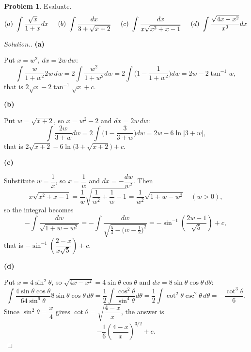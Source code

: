 \documentclass[11pt,a4paper]{article}
\theoremstyle{definition}
\newtheorem{problemx}{Problem}[subsection]
\newenvironment{problem}{\begin{problemx}}{\end{problemx}}
\newenvironment{solution}
  {\renewcommand{\qedsymbol}{}\begin{proof}[\textit{Solution}.]}
  {\end{proof}}
\newcommand{\subhead}[1]{%
  \par\medskip\noindent\textbf{#1}\par\nobreak\smallskip}
\begin{document}
\begin{problem}
Evaluate.
$$(a)\ \int\frac{\sqrt x}{1+x}dx\hspace{0.5cm}
(b)\ \int\frac{dx}{3+\sqrt{x+2}}\hspace{0.5cm}
(c)\ \int\frac{dx}{x\sqrt{x^2+x-1}}\hspace{0.5cm}
(d)\ \int\frac{\sqrt{4x-x^2}}{x^3}dx$$
\end{problem}
\begin{solution}
\subhead{(a)} Put $x = w^2$, $dx = 2w\,dw$:
$$\int\frac{w}{1+w^2}2w\,dw = 2\int\frac{w^2}{1+w^2}dw
= 2\int\Big(1 - \frac{1}{1+w^2}\Big)dw = 2w - 2\tan^{-1}w ,$$
that is $2\sqrt x - 2\tan^{-1}\sqrt x + c$.

\subhead{(b)} Put $w = \sqrt{x+2}$, so $x = w^2-2$ and $dx = 2w\,dw$:
$$\int\frac{2w}{3+w}dw = 2\int\Big(1 - \frac{3}{3+w}\Big)dw
= 2w - 6\ln\left|3+w\right| ,$$
that is $2\sqrt{x+2} - 6\ln\big(3+\sqrt{x+2}\big) + c$.

\subhead{(c)} Substitute $w = \dfrac1x$, so $x = \dfrac1w$ and
$dx = -\dfrac{dw}{w^2}$. Then
$$x\sqrt{x^2+x-1} = \frac1w\sqrt{\frac{1}{w^2} + \frac1w - 1}
= \frac{1}{w^2}\sqrt{1 + w - w^2}\quad (w>0),$$
so the integral becomes
$$-\int\frac{dw}{\sqrt{1+w-w^2}}
= -\int\frac{dw}{\sqrt{\frac54 - \big(w-\frac12\big)^2}}
= -\sin^{-1}\!\left(\frac{2w-1}{\sqrt5}\right) + c ,$$
that is
$-\sin^{-1}\!\left(\dfrac{2-x}{x\sqrt5}\right) + c$.

\subhead{(d)} Put $x = 4\sin^2\theta$, so
$\sqrt{4x-x^2} = 4\sin\theta\cos\theta$ and
$dx = 8\sin\theta\cos\theta\,d\theta$:
$$\int\frac{4\sin\theta\cos\theta}{64\sin^6\theta}8\sin\theta\cos\theta\,d\theta
= \frac12\int\frac{\cos^2\theta}{\sin^4\theta}d\theta
= \frac12\int\cot^2\theta\csc^2\theta\,d\theta
= -\frac{\cot^3\theta}{6}.$$
Since $\sin^2\theta = \dfrac{x}{4}$ gives
$\cot\theta = \sqrt{\dfrac{4-x}{x}}$, the answer is
$$-\frac16\left(\frac{4-x}{x}\right)^{3/2} + c .$$
\end{solution}
\end{document}
